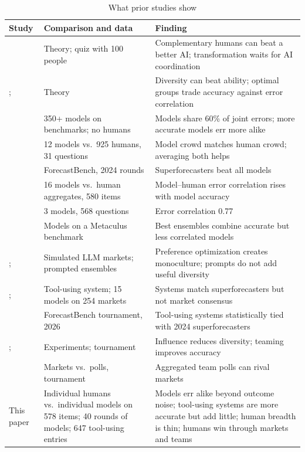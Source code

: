\documentclass[11pt,a4paper]{article}
\theoremstyle{definition}
\begin{document}
\begin{table}[t]
\centering
\caption{What prior studies show}\label{tab:lit}
\footnotesize
\renewcommand{\arraystretch}{1.12}
\begin{tabularx}{\textwidth}{L{3.3cm} L{4.2cm} Y}
\toprule
Study & Comparison and data & Finding \\
\midrule
\citet{imas2026organizing} & Theory; quiz with 100 people & Complementary humans can beat a better AI; transformation waits for AI coordination \\
\citet{hong2004groups}; \citet{lamberson2012optimal} & Theory & Diversity can beat ability; optimal groups trade accuracy against error correlation \\
\citet{kim2025correlated} & 350+ models on benchmarks; no humans & Models share 60\% of joint errors; more accurate models err more alike \\
\citet{schoenegger2024wisdom} & 12 models vs.\ 925 humans, 31 questions & Model crowd matches human crowd; averaging both helps \\
\citet{karger2025forecastbench} & ForecastBench, 2024 rounds & Superforecasters beat all models \\
\citet{jeddi2026crowdsourced} & 16 models vs.\ human aggregates, 580 items & Model--human error correlation rises with model accuracy \\
\citet{spiro2026oracle} & 3 models, 568 questions & Error correlation 0.77 \\
\citet{aitchison2026diversity} & Models on a Metaculus benchmark & Best ensembles combine accurate but less correlated models \\
\citet{begin2026preference}; \citet{qian2026nous} & Simulated LLM markets; prompted ensembles & Preference optimization creates monoculture; prompts do not add useful diversity \\
\citet{alur2025aia}; \citet{douven2026wisdom} & Tool-using system; 15 models on 254 markets & Systems match superforecasters but not market consensus \\
\citet{fri2026parity} & ForecastBench tournament, 2026 & Tool-using systems statistically tied with 2024 superforecasters \\
\citet{lorenz2011social}; \citet{mellers2014psychological} & Experiments; tournament & Influence reduces diversity; teaming improves accuracy \\
\citet{atanasov2017distilling} & Markets vs.\ polls, tournament & Aggregated team polls can rival markets \\
\midrule
This paper & Individual humans vs.\ individual models on 578 items; 40 rounds of models; 647 tool-using entries & Models err alike beyond outcome noise; tool-using systems are more accurate but add little; human breadth is thin; humans win through markets and teams \\
\bottomrule
\end{tabularx}
\end{table}
\end{document}
